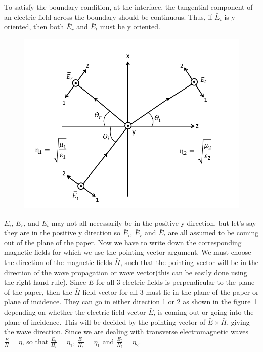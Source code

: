 To satisfy the boundary condition, at the interface, the tangential component of an electric field across the boundary should be continuous. Thus, if $\bar{E}_{i}$ is y oriented, then both  $\bar{E}_{r}$ and  $\bar{E}_{t}$ must be y oriented.
\begin{figure}[h]
\centering
\includegraphics[scale=0.44]{graphics/perpendicular_polarization2}
\caption{}
\label{fig:13}
\end{figure}

$\bar{E}_{i}$, $\bar{E}_{r}$, and  $\bar{E}_{t}$ may not all necessarily be in the positive y direction, but let's say they are in the positive y direction so  $\bar{E}_{i}$,  $\bar{E}_{r}$ and  $\bar{E}_{t}$ are all assumed to be coming out of the plane of the paper. Now we have to write down the corresponding magnetic fields for which we use the pointing vector argument. We must choose the direction of the magnetic fields $\bar{H}$, such that the pointing vector will be in the direction of the wave propagation or wave vector(this can be easily done using the right-hand rule). Since $\bar{E}$ for all 3 electric fields is perpendicular to the plane of the paper, then the $\bar{H}$ field vector for all 3 must lie in the plane of the paper or plane of incidence. They can go in either direction 1 or 2 as shown in the figure~\ref{fig:13} depending on whether the electric field vector $\bar{E}$, is coming out or going into the plane of incidence. This will be decided by the pointing vector of  $\bar{E} \times \bar{H}$, giving the wave direction. Since we are dealing with transverse electromagnetic waves $\frac{E}{H} = \eta$, so that $\frac{E_{i}}{H_{i}} = \eta_{1}$, $\frac{E_{r}}{H_{r}} = \eta_{1}$ and  $\frac{E_{t}}{H_{t}} = \eta_{2}$.

